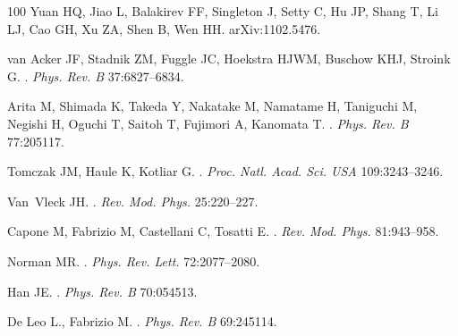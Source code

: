 \documentclass[]{ar2e-changed}%
\begin{document}
\begin{thebibliography}{100}
{Yuan} HQ, {Jiao} L, {Balakirev} FF, {Singleton} J, {Setty} C, {Hu} JP, {Shang}
  T, {Li} LJ, {Cao} GH, {Xu} ZA, {Shen} B, {Wen} HH.
\newblock arXiv:1102.5476.

van Acker JF, Stadnik ZM, Fuggle JC, Hoekstra HJWM, Buschow KHJ, Stroink G.
.
\newblock \emph{Phys. Rev. B} 37:6827--6834.

Arita M, Shimada K, Takeda Y, Nakatake M, Namatame H, Taniguchi M, Negishi H,
  Oguchi T, Saitoh T, Fujimori A, Kanomata T.
.
\newblock \emph{Phys. Rev. B} 77:205117.

Tomczak JM, Haule K, Kotliar G.
.
\newblock \emph{Proc. Natl. Acad. Sci. USA} 109:3243--3246.

Van~Vleck JH.
.
\newblock \emph{Rev. Mod. Phys.} 25:220--227.

Capone M, Fabrizio M, Castellani C, Tosatti E.
.
\newblock \emph{Rev. Mod. Phys.} 81:943--958.

Norman MR.
.
\newblock \emph{Phys. Rev. Lett.} 72:2077--2080.

Han JE.
.
\newblock \emph{Phys. Rev. B} 70:054513.

De Leo L., Fabrizio M.
.
\newblock \emph{Phys. Rev. B} 69:245114.

\end{thebibliography}
\end{document}
